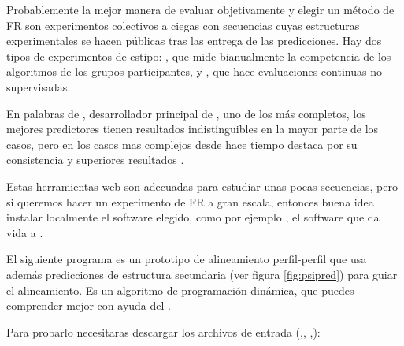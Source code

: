 Probablemente la mejor manera de evaluar objetivamente y elegir un m\'{e}todo de FR 
son experimentos colectivos a ciegas con secuencias cuyas estructuras experimentales se hacen p\'{u}blicas
tras las entrega de las predicciones. Hay dos tipos de experimentos de estipo: 
, 
que mide bianualmente la competencia de los algoritmos de los grupos participantes, y 
, que hace evaluaciones continuas no supervisadas.

En palabras de \citet{Kelley2015}, desarrollador principal de 
, uno de los m\'{a}s completos,
los mejores predictores tienen resultados indistinguibles en la mayor parte de los casos,
pero en los casos mas complejos desde hace tiempo destaca por su consistencia y 
superiores resultados .


Estas herramientas web son adecuadas para estudiar unas pocas secuencias, pero si queremos hacer un experimento de FR 
a gran escala, entonces buena idea instalar localmente el software elegido, como por ejemplo
, el software que da vida a 
.

El siguiente programa es un prototipo de alineamiento perfil-perfil que usa adem\'{a}s predicciones de estructura secundaria (ver figura \ref{fig:psipred}) 
para guiar el alineamiento. Es un algoritmo de programaci\'{o}n din\'{a}mica, que puedes comprender mejor con ayuda 
del  \citep{Ibarra2010}.

Para probarlo necesitaras descargar los archivos de entrada
(,,
,):


